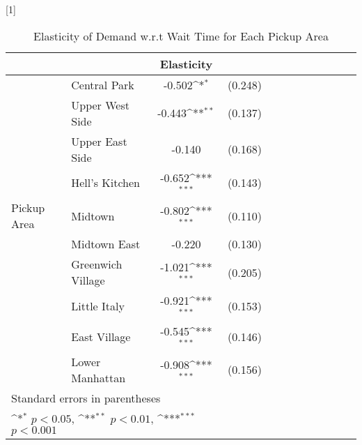 
\begin{table}[h]
\caption{Elasticity of Demand w.r.t Wait Time for Each Pickup Area}\label{tab:each_lnuber}
{
\def\sym#1{\ifmmode^{#1}\else\(^{#1}\)\fi}
\begin{center}
\scalebox{1}[1]{
\begin{tabular}{l*{11}{c}}
\hline\hline
                        
            & &\multicolumn{1}{c}{Elasticity}&
            
            \\

\hline
&\multicolumn{1}{l}{Central Park}      &   -0.502\sym{*} &
 (0.248)\\
&\multicolumn{1}{l}{Upper West Side} &   -0.443\sym{**} &
 (0.137)\\
&\multicolumn{1}{l}{Upper East Side} &  -0.140&	
 (0.168)\\
&\multicolumn{1}{l}{Hell's Kitchen} &  -0.652\sym{***}&
 (0.143)\\
\multicolumn{1}{l}{Pickup Area} & \multicolumn{1}{l}{Midtown} &  -0.802\sym{***}& (0.110)\\
&\multicolumn{1}{l}{Midtown East} &  -0.220&	(0.130)\\
&\multicolumn{1}{l}{Greenwich Village} &  -1.021\sym{***} &(0.205)\\
&\multicolumn{1}{l}{Little Italy} & -0.921\sym{***}&	(0.153)\\
&\multicolumn{1}{l}{East Village} &  -0.545\sym{***}& (0.146)\\
&\multicolumn{1}{l}{Lower Manhattan} &  -0.908\sym{***}& (0.156)\\

\hline\hline
\multicolumn{3}{l}{\footnotesize Standard errors in parentheses}\\
\multicolumn{3}{l}{\footnotesize \sym{*} \(p<0.05\), \sym{**}
 \(p<0.01\), \sym{***} \(p<0.001\)}\\
\end{tabular}
}
\end{center}
}

\end{table}










